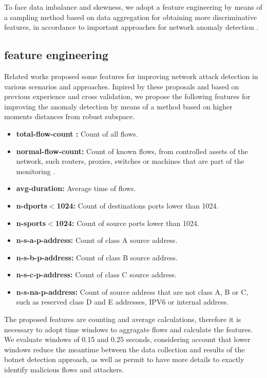 \documentclass[review]{elsarticle}
\begin{document}
To face data imbalance and skewness, we adopt a feature engineering by means of a sampling method based on data aggregation for obtaining more discriminative features, in accordance to important approaches for network anomaly detection \cite{lakhina2005mining, callegari2011novel, garcia2014empirical, chandrashekar2014survey,acarali2016survey, vieira2017model}.

\subsection{feature engineering}
\label{sec:feat_eng}

Related works proposed some features for improving network attack detection in various scenarios and approaches\cite{lakhina2005mining,gu2008botminer,callegari2011novel,chandrashekar2014survey,garcia2014empirical,acarali2016survey}. Inpired by these proposals and based on previous experience \cite{vieira2017model, galibus2017offline} and cross validation, we propose the following features for improving the anomaly detection by means of a method based on higher moments distances from robust subspace.
	
\begin{itemize}
	\item \textbf{total-flow-count :} Count of all flows.
	\item \textbf{normal-flow-count:} Count of known flows, from controlled assets of the network, such routers, proxies, switches or machines that are part of the monitoring \cite{garcia2014identifying}.
	\item \textbf{avg-duration:} Average time of flows.
	\item \textbf{n-dports$<$1024:} Count of destinations ports lower than 1024.
	\item \textbf{n-sports$<$1024:} Count of source ports lower than 1024.
	\item \textbf{n-s-a-p-address:} Count of class A source address.
	\item \textbf{n-s-b-p-address:} Count of class B source address.
	\item \textbf{n-s-c-p-address:} Count of class C source address.
	\item \textbf{n-s-na-p-address:} Count of source address that are not class A, B or C, such as reserved class D and E addresses, IPV6 or internal address.
\end{itemize}

The proposed features are counting and average calculations, therefore it is necessary to adopt time windows to aggragate flows and calculate the features. We evaluate windows of 0.15 and 0.25 seconds, considering account that lower windows reduce the meantime between the data collection and results of the botnet detection approach, as well as permit to have more details to exactly identify malicious flows and attackers.
\end{document}

